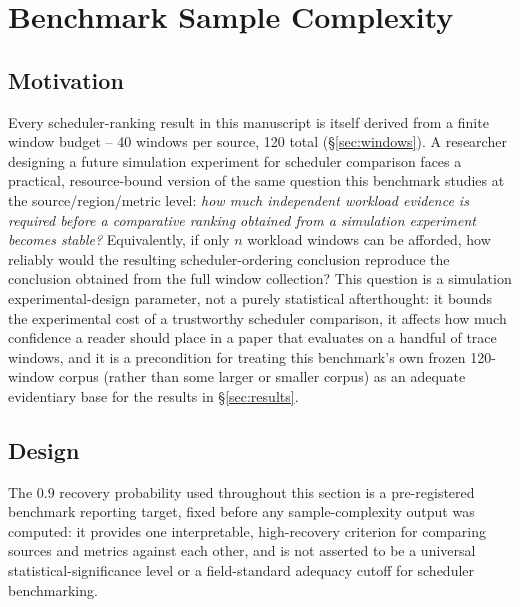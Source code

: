\section{Benchmark Sample Complexity}
\label{sec:sample-complexity}

\subsection{Motivation}
\label{sec:sample-complexity-motivation}

Every scheduler-ranking result in this manuscript is itself derived from a
finite window budget -- 40 windows per source, 120 total
(\S\ref{sec:windows}). A researcher designing a future simulation
experiment for scheduler comparison faces a practical, resource-bound
version of the same question this benchmark studies at the
source/region/metric level: \emph{how much independent workload evidence is
required before a comparative ranking obtained from a simulation experiment
becomes stable?} Equivalently, if only $n$ workload windows can be afforded,
how reliably would the resulting scheduler-ordering conclusion reproduce
the conclusion obtained from the full window collection? This question is a
simulation experimental-design parameter, not a purely statistical
afterthought: it bounds the experimental cost of a trustworthy scheduler
comparison, it affects how much confidence a reader should place in a paper
that evaluates on a handful of trace windows, and it is a precondition for
treating this benchmark's own frozen 120-window corpus (rather than some
larger or smaller corpus) as an adequate evidentiary base for the results in
\S\ref{sec:results}.

\subsection{Design}
\label{sec:sample-complexity-design}

The $0.9$ recovery probability used throughout this section is a
pre-registered benchmark reporting target, fixed before any
sample-complexity output was computed: it provides one interpretable,
high-recovery criterion for comparing sources and metrics against each
other, and is not asserted to be a universal statistical-significance
level or a field-standard adequacy cutoff for scheduler benchmarking.

